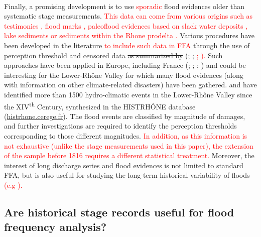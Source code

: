\documentclass[11pt]{article}
\begin{document}
    \paragraph{}
    Finally, a promising development is to use \textcolor{red}{sporadic} flood evidences older than systematic stage measurements. 
    \textcolor{red}{This data can come from various origins such as testimonies \citep{pichard_sept_2014}, flood marks \citep{renard_use_2023}, paleoflood evidences based on slack water deposits \citep{sheffer_paleofloods_2003}, lake sediments \citep{wilhelm_reconstructing_2022} or sediments within the Rhone prodelta \citep{fanget_historical_2013}.} Various procedures have been developed in the literature \textcolor{red}{to include such data in FFA} through the use of perception threshold and censored data \sout{as summarized by} (\cite{brazdil_historical_2006}; \cite{kjeldsen_documentary_2014};\textcolor{red}{ \cite{england_guidelines_2019}; \cite{harden_historical_2021}).} Such approaches have been applied in Europe, including France (\citet{naulet_flood_2005}; \citet{lang_extrapolation_2010}; \citet{neppel_flood_2010}; \citet{payrastre_usefulness_2011}) and could be interesting for the Lower-Rhône Valley for which many flood evidences (along with information on other climate-related disasters) have been gathered. \citet{pichard_sept_2014} and \citet{pichard_hydro-climatology_2017} have identified more than 1500 hydro-climatic events in the Lower-Rhône Valley since the XIV\textsuperscript{th} Century, synthesized in the HISTRHÔNE database (\url{histrhone.cerege.fr}). The flood events are classified by magnitude of damages, and further investigations are required to identify the perception thresholds corresponding to those different magnitudes. \textcolor{red}{In addition, as this information is not exhaustive (unlike the stage measurements used in this paper), the extension of the sample before 1816 requires a different statistical treatment.} Moreover, the interest of long discharge series and flood evidences is not limited to standard FFA, but is also useful for studying the long-term historical variability of floods \textcolor{red}{(e.g \cite{macdonald_high-magnitude_2017}).}
  
    \subsection{Are historical stage records useful for flood frequency analysis?}
\end{document}
